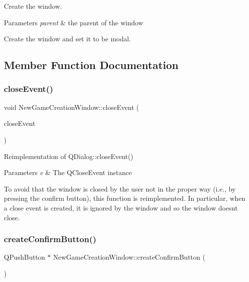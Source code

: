 Create the window. 


\begin{DoxyParams}{Parameters}
{\em parent} & the parent of the window\\
\hline
\end{DoxyParams}
Create the window and set it to be modal. 

\subsection{Member Function Documentation}
\mbox{\label{classNewGameCreationWindow_ad96277fa809e77e33ade1a93fc4af5d7}} 
\subsubsection{\texorpdfstring{close\+Event()}{closeEvent()}}
{\footnotesize\ttfamily void New\+Game\+Creation\+Window\+::close\+Event (\begin{DoxyParamCaption}\item[{Q\+Close\+Event $\ast$}]{close\+Event }\end{DoxyParamCaption})\hspace{0.3cm}{\ttfamily [protected]}}



Reimplementation of Q\+Dialog\+::close\+Event() 


\begin{DoxyParams}{Parameters}
{\em e} & The Q\+Close\+Event instance\\
\hline
\end{DoxyParams}
To avoid that the window is closed by the user not in the proper way (i.\+e., by pressing the confirm button), this function is reimplemented. In particular, when a close event is created, it is ignored by the window and so the window doesn\textquotesingle{}t close. \mbox{\label{classNewGameCreationWindow_aaa0b36302cf67c363da723e64c92c777}} 
\subsubsection{\texorpdfstring{create\+Confirm\+Button()}{createConfirmButton()}}
{\footnotesize\ttfamily Q\+Push\+Button $\ast$ New\+Game\+Creation\+Window\+::create\+Confirm\+Button (\begin{DoxyParamCaption}{ }\end{DoxyParamCaption})\hspace{0.3cm}{\ttfamily [protected]}}



